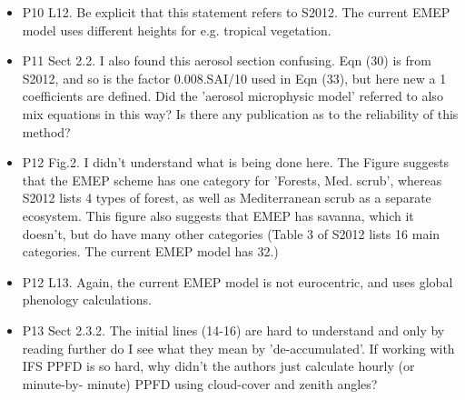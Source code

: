 \documentclass{scrartcl}
\begin{document}
\begin{itemize}
\item {\color{blue}P10 L12. Be explicit that this statement refers to S2012. The current EMEP
model uses different heights for e.g. tropical vegetation.}
\item {\color{blue}P11 Sect 2.2. I also found this aerosol section confusing. Eqn (30) is from S2012,
and so is the factor 0.008.SAI/10 used in Eqn (33), but here new a 1 coefficients
are defined. Did the ’aerosol microphysic model’ referred to also mix equations
in this way? Is there any publication as to the reliability of this method?}
\item {\color{blue}P12 Fig.2. I didn’t understand what is being done here. The Figure suggests that
the EMEP scheme has one category for ’Forests, Med. scrub’, whereas S2012
lists 4 types of forest, as well as Mediterranean scrub as a separate ecosystem.
This figure also suggests that EMEP has savanna, which it doesn’t, but do have
many other categories (Table 3 of S2012 lists 16 main categories. The current
EMEP model has 32.)}
\item {\color{blue}P12 L13. Again, the current EMEP model is not eurocentric, and uses global
phenology calculations.}
\item {\color{blue}P13 Sect 2.3.2. The initial lines (14-16) are hard to understand and only by
reading further do I see what they mean by ’de-accumulated’. If working with
IFS PPFD is so hard, why didn’t the authors just calculate hourly (or minute-by-
minute) PPFD using cloud-cover and zenith angles?}

\end{itemize}
\newpage
\end{document}
